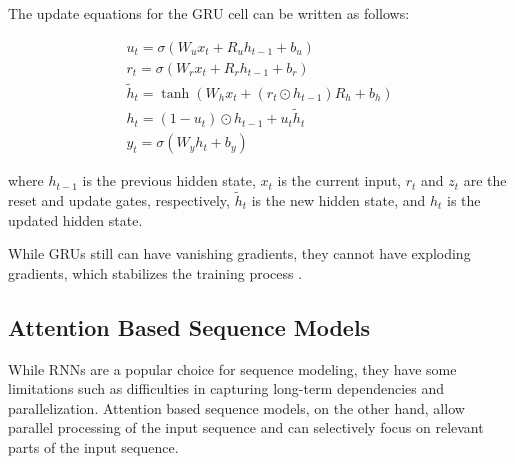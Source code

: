 The update equations for the GRU cell can be written as follows:

\begin{align}
    u_t = \sigma(W_u x_t + R_u h_{t-1} + b_u)\\
    r_t = \sigma(W_r x_t + R_r h_{t-1} + b_r)\\
    \tilde{h}_t = \tanh(W_h x_t + (r_t \odot h_{t-1})R_h + b_h)\\
    h_t = (1 - u_t) \odot h_{t-1} + u_t \tilde{h}_t\\
    y_t = \sigma(W_y h_t + b_y)
\end{align}



where $h_{t-1}$ is the previous hidden state, $x_t$ is the current input, $r_t$ and $z_t$ are the reset and update gates, respectively, $\tilde{h}_t$ is the new hidden state, and $h_t$ is the updated hidden state.

While GRUs still can have vanishing gradients, they cannot have exploding gradients, which stabilizes the training process \cite{cahuantzi2023comparison}.


\subsection{Attention Based Sequence Models}

While RNNs are a popular choice for sequence modeling, they have some limitations such as difficulties in capturing long-term dependencies and parallelization.
Attention based sequence models, on the other hand, allow parallel processing of the input sequence and can selectively focus on relevant parts of the 
input sequence. \\

